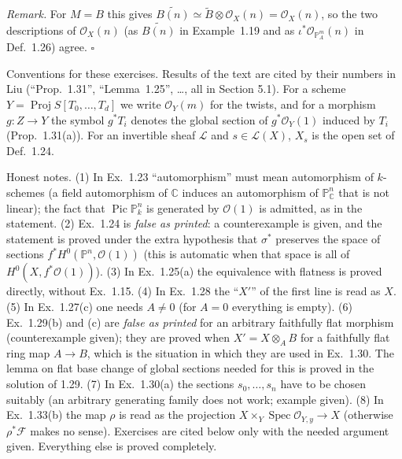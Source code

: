 \documentclass[11pt]{article}
\begin{document}
\emph{Remark.} For $M=B$ this gives $\widetilde{B(n)}\simeq\widetilde B\otimes\mathcal O_X(n)=\mathcal O_X(n)$, so the two descriptions of $\mathcal O_X(n)$ (as $\widetilde{B(n)}$ in Example~1.19 and as $\iota^*\mathcal O_{\mathbb P^m_A}(n)$ in Def.~1.26) agree. \hfill$\square$

Conventions for these exercises. Results of the text are cited by their numbers in Liu (``Prop.~1.31'', ``Lemma~1.25'', \dots, all in Section 5.1). For a scheme $Y=\operatorname{Proj}S[T_0,\dots,T_d]$ we write $\mathcal{O}_Y(m)$ for the twists, and for a morphism $g:Z\to Y$ the symbol $g^*T_i$ denotes the global section of $g^*\mathcal{O}_Y(1)$ induced by $T_i$ (Prop.~1.31(a)). For an invertible sheaf $\mathcal{L}$ and $s\in\mathcal{L}(X)$, $X_s$ is the open set of Def.~1.24.

Honest notes. (1) In Ex.~1.23 ``automorphism'' must mean automorphism of $k$-schemes (a field automorphism of $\mathbb{C}$ induces an automorphism of $\mathbb{P}^n_{\mathbb{C}}$ that is not linear); the fact that $\operatorname{Pic}\mathbb{P}^n_k$ is generated by $\mathcal{O}(1)$ is admitted, as in the statement. (2) Ex.~1.24 is \emph{false as printed}: a counterexample is given, and the statement is proved under the extra hypothesis that $\sigma^*$ preserves the space of sections $f^*H^0(\mathbb{P}^n,\mathcal{O}(1))$ (this is automatic when that space is all of $H^0(X,f^*\mathcal{O}(1))$). (3) In Ex.~1.25(a) the equivalence with flatness is proved directly, without Ex.~1.15. (4) In Ex.~1.28 the ``$X'$'' of the first line is read as $X$. (5) In Ex.~1.27(c) one needs $A\neq0$ (for $A=0$ everything is empty). (6) Ex.~1.29(b) and (c) are \emph{false as printed} for an arbitrary faithfully flat morphism (counterexample given); they are proved when $X'=X\otimes_AB$ for a faithfully flat ring map $A\to B$, which is the situation in which they are used in Ex.~1.30. The lemma on flat base change of global sections needed for this is proved in the solution of 1.29. (7) In Ex.~1.30(a) the sections $s_0,\dots,s_n$ have to be chosen suitably (an arbitrary generating family does not work; example given). (8) In Ex.~1.33(b) the map $\rho$ is read as the projection $X\times_Y\operatorname{Spec}\mathcal{O}_{Y,y}\to X$ (otherwise $\rho^*\mathcal{F}$ makes no sense). Exercises are cited below only with the needed argument given. Everything else is proved completely.
\end{document}

